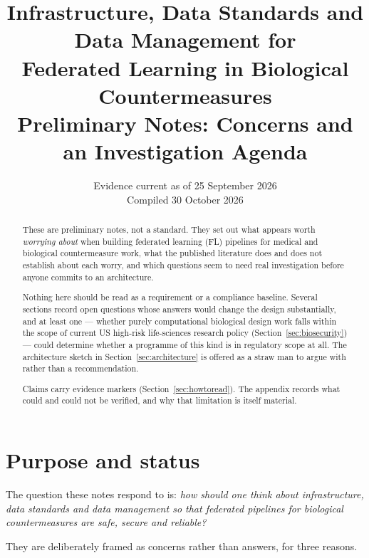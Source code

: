 \documentclass[11pt,a4paper]{article}
\title{\textbf{Infrastructure, Data Standards and Data Management for\\
Federated Learning in Biological Countermeasures}\\[0.4em]
\large Preliminary Notes: Concerns and an Investigation Agenda}
\author{}
\date{Evidence current as of 25 September 2026\\[0.3em]
\small Compiled 30 October 2026}
\begin{document}
\maketitle
\thispagestyle{fancy}

\begin{abstract}
\noindent
These are preliminary notes, not a standard. They set out what appears
worth \emph{worrying about} when building federated learning (FL) pipelines
for medical and biological countermeasure work, what the published
literature does and does not establish about each worry, and which
questions seem to need real investigation before anyone commits to an
architecture.

Nothing here should be read as a requirement or a compliance baseline.
Several sections record open questions whose answers would change the
design substantially, and at least one --- whether purely computational
biological design work falls within the scope of current US high-risk
life-sciences research policy (Section~\ref{sec:biosecurity}) --- could
determine whether a programme of this kind is in regulatory scope at all.
The architecture sketch in Section~\ref{sec:architecture} is offered as a
straw man to argue with rather than a recommendation.

Claims carry evidence markers (Section~\ref{sec:howtoread}). The appendix
records what could and could not be verified, and why that limitation is
itself material.
\end{abstract}

\tableofcontents

\section{Purpose and status}

The question these notes respond to is: \emph{how should one think about
infrastructure, data standards and data management so that federated
pipelines for biological countermeasures are safe, secure and reliable?}

They are deliberately framed as concerns rather than answers, for three
reasons.
\end{document}
